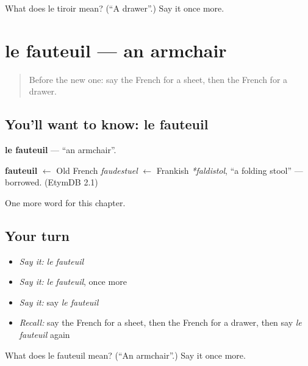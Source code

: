 \begin{tcolorbox}[breakable,colback=teal!4,colframe=teal!35!black,title={Before you move on}]
What does le tiroir mean? (\textquotedblleft{}A drawer\textquotedblright{}.) Say it once more.
\end{tcolorbox}
\section[le fauteuil]{le fauteuil — an armchair}

\label{lesson:FR-C193-fauteuil}



\begin{quote}
Before the new one: say the French for a sheet, then the French for a drawer.
\end{quote}

\subsection*{You'll want to know: le fauteuil}
\textbf{le fauteuil} — \textquotedblleft{}an armchair\textquotedblright{}.

\begin{cousinweb}
\textbf{fauteuil} $\leftarrow$ Old French \emph{faudestuel} $\leftarrow$ Frankish \emph{*faldistol}, \textquotedblleft{}a folding stool\textquotedblright{} — borrowed. (EtymDB 2.1)
\end{cousinweb}

\begin{grammarlens}[title={What you've built}]
One more word for this chapter.
\end{grammarlens}

\subsection*{Your turn}
\begin{itemize}
\raggedright
  \item \emph{Say it:} \emph{le fauteuil}
  \item \emph{Say it:} \emph{le fauteuil}, once more
  \item \emph{Say it:} say \emph{le fauteuil}
  \item \emph{Recall:} say the French for a sheet, then the French for a drawer, then say \emph{le fauteuil} again
\end{itemize}

\begin{tcolorbox}[breakable,colback=teal!4,colframe=teal!35!black,title={Before you move on}]
What does le fauteuil mean? (\textquotedblleft{}An armchair\textquotedblright{}.) Say it once more.
\end{tcolorbox}
